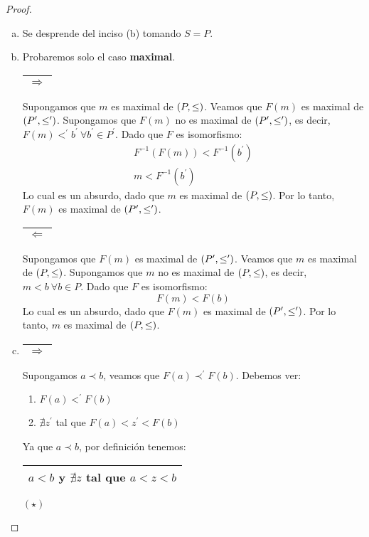 \begin{proof}
\begin{enumerate}[a)]
      \item Se desprende del inciso (b) tomando $S = P$.
      \item Probaremos solo el caso \textbf{maximal}.
        \PN \begin{tabular}{|c|} \hline $\Rightarrow$ \\\hline \end{tabular} Supongamos que $m$ es maximal de
        $(P, \leq)$. Veamos que $F(m)$ es maximal de $(P^{\prime}, \leq^{\prime})$. Supongamos que $F(m)$ no es maximal
        de $(P^{\prime}, \leq^{\prime})$, es decir, $F(m) <^{\prime} b^{\prime} \ \forall b^{\prime} \in P^{\prime}$.
        Dado que $F$ es isomorfismo:
        \begin{eqnarray*}
    			F^{-1}(F(m)) < F^{-1}(b^{\prime}) \\
    			m < F^{-1}(b^{\prime})
    		\end{eqnarray*}
        \PN Lo cual es un absurdo, dado que $m$ es maximal de $(P, \leq)$. Por lo tanto, $F(m)$ es maximal de
        $(P^{\prime}, \leq^{\prime})$.

        \PN \begin{tabular}{|c|} \hline $\Leftarrow$ \\\hline \end{tabular} Supongamos que $F(m)$ es maximal de
        $(P^{\prime}, \leq^{\prime})$. Veamos que $m$ es maximal de $(P, \leq)$. Supongamos que $m$ no es maximal
        de $(P, \leq)$, es decir, $m < b \ \forall b \in P$. Dado que $F$ es isomorfismo:
        \[
    			F(m) < F(b)
    		\]
        \PN Lo cual es un absurdo, dado que $F(m)$ es maximal de $(P^{\prime}, \leq^{\prime})$. Por lo tanto, $m$ es
        maximal de $(P, \leq)$.

      \item \begin{tabular}{|c|} \hline $\Rightarrow$ \\\hline \end{tabular} Supongamos $a \prec b$, veamos que $F(a)
        \prec^{\prime} F(b)$. Debemos ver:
        \begin{enumerate}[1)]
          \item $F(a) <^{\prime} F(b)$
          \item $\nexists z^{\prime}$ tal que $F(a) < z^{\prime} < F(b)$
        \end{enumerate}

        \PN Ya que $a \prec b$, por definición tenemos: \begin{tabular}{|c|} \hline $a < b$ y $\nexists z$ tal que
        $a < z < b$ \\\hline \end{tabular} $(\star)$


\end{enumerate}
\end{proof}
